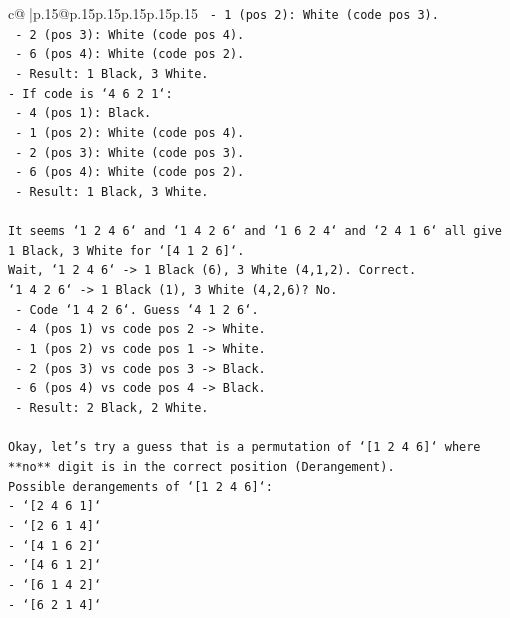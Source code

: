 \documentclass{article}
\begin{document}
{\begin{supertabular}{c@{$\;$}|p{.15\linewidth}@{}p{.15\linewidth}p{.15\linewidth}p{.15\linewidth}p{.15\linewidth}p{.15\linewidth}}
{{{\texttt{  {-} 1 (pos 2): White (code pos 3).} \\
\texttt{  {-} 2 (pos 3): White (code pos 4).} \\
\texttt{  {-} 6 (pos 4): White (code pos 2).} \\
\texttt{  {-} Result: 1 Black, 3 White.} \\
\texttt{{-} If code is `4 6 2 1`:} \\
\texttt{  {-} 4 (pos 1): Black.} \\
\texttt{  {-} 1 (pos 2): White (code pos 4).} \\
\texttt{  {-} 2 (pos 3): White (code pos 3).} \\
\texttt{  {-} 6 (pos 4): White (code pos 2).} \\
\texttt{  {-} Result: 1 Black, 3 White.} \\
\\ 
\texttt{It seems `1 2 4 6` and `1 4 2 6` and `1 6 2 4` and `2 4 1 6` all give 1 Black, 3 White for `{[}4 1 2 6{]}`.} \\
\texttt{Wait, `1 2 4 6` {-}> 1 Black (6), 3 White (4,1,2). Correct.} \\
\texttt{`1 4 2 6` {-}> 1 Black (1), 3 White (4,2,6)? No.} \\
\texttt{  {-} Code `1 4 2 6`. Guess `4 1 2 6`.} \\
\texttt{  {-} 4 (pos 1) vs code pos 2 {-}> White.} \\
\texttt{  {-} 1 (pos 2) vs code pos 1 {-}> White.} \\
\texttt{  {-} 2 (pos 3) vs code pos 3 {-}> Black.} \\
\texttt{  {-} 6 (pos 4) vs code pos 4 {-}> Black.} \\
\texttt{  {-} Result: 2 Black, 2 White.} \\
\\ 
\texttt{Okay, let's try a guess that is a permutation of `{[}1 2 4 6{]}` where **no** digit is in the correct position (Derangement).} \\
\texttt{Possible derangements of `{[}1 2 4 6{]}`:} \\
\texttt{{-} `{[}2 4 6 1{]}`} \\
\texttt{{-} `{[}2 6 1 4{]}`} \\
\texttt{{-} `{[}4 1 6 2{]}`} \\
\texttt{{-} `{[}4 6 1 2{]}`} \\
\texttt{{-} `{[}6 1 4 2{]}`} \\
\texttt{{-} `{[}6 2 1 4{]}`} \\
\\ 
}}}
\end{supertabular}}
\end{document}
